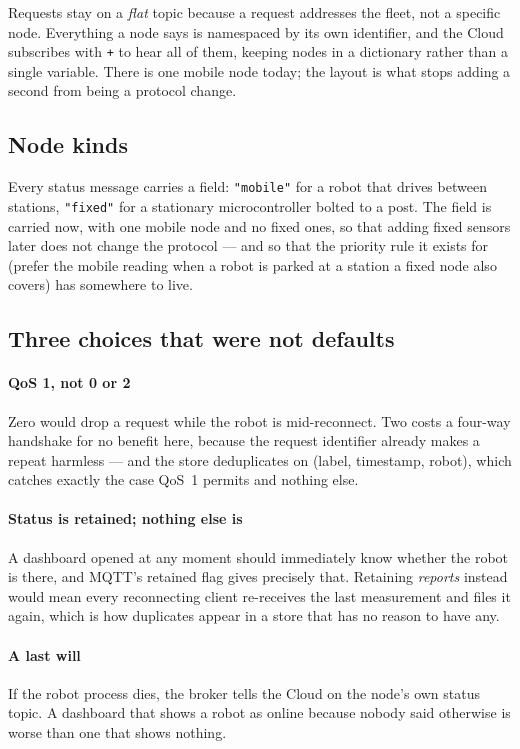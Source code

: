Requests stay on a \emph{flat} topic because a request addresses the
fleet, not a specific node. Everything a node says is namespaced by its
own identifier, and the Cloud subscribes with \texttt{+} to hear all of
them, keeping nodes in a dictionary rather than a single variable. There
is one mobile node today; the layout is what stops adding a second from
being a protocol change.

\subsection{Node kinds}

Every status message carries a  field:
\texttt{"mobile"} for a robot that drives between stations,
\texttt{"fixed"} for a stationary microcontroller bolted to a post. The
field is carried now, with one mobile node and no fixed ones, so that
adding fixed sensors later does not change the protocol --- and so that
the priority rule it exists for (prefer the mobile reading when a robot
is parked at a station a fixed node also covers) has somewhere to live.

\subsection{Three choices that were not defaults}

\paragraph{QoS 1, not 0 or 2} Zero would drop a request while the robot
is mid-reconnect. Two costs a four-way handshake for no benefit here,
because the request identifier already makes a repeat harmless --- and
the store deduplicates on (label, timestamp, robot), which catches
exactly the case QoS~1 permits and nothing else.

\paragraph{Status is retained; nothing else is} A dashboard opened at
any moment should immediately know whether the robot is there, and MQTT's
retained flag gives precisely that. Retaining \emph{reports} instead
would mean every reconnecting client re-receives the last measurement and
files it again, which is how duplicates appear in a store that has no
reason to have any.

\paragraph{A last will} If the robot process dies, the broker tells the
Cloud on the node's own status topic. A dashboard that shows a robot as
online because nobody said otherwise is worse than one that shows
nothing.

